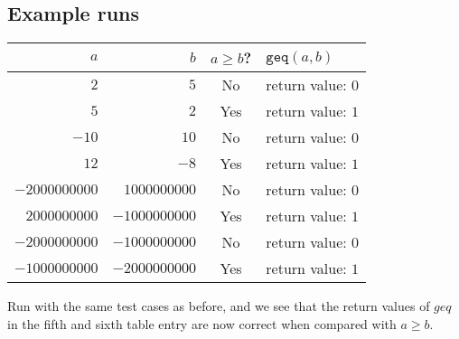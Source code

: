 \documentclass[12pt,a4paper]{article}
\begin{document}
\subsection{Example runs}

\begin{tabular}{rrcl}
	$a$ & $b$ & $a\geq b$? & $\texttt{geq}(a, b)$ \\
	\hline
	$2$ & $5$ & No & return value: $0$ \\
	$5$ & $2$ & Yes & return value: $1$ \\
	$-10$ & $10$ & No & return value: $0$ \\
	$12$ & $-8$ & Yes & return value: $1$ \\
	$-2000000000$ & $1000000000$ & No & return value: $0$ \\
	$2000000000$ & $-1000000000$ & Yes & return value: $1$ \\
	$-2000000000$ & $-1000000000$ & No & return value: $0$ \\
	$-1000000000$ & $-2000000000$ & Yes & return value: $1$
\end{tabular}

Run with the same test cases as before, and we see that the return values of
$geq$ in the fifth and sixth table entry are now correct when compared with
$a\geq b$.
\end{document}
